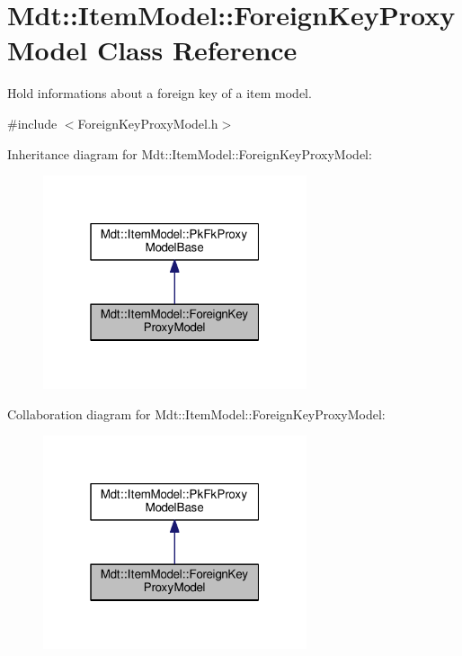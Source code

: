 \hypertarget{class_mdt_1_1_item_model_1_1_foreign_key_proxy_model}{}\section{Mdt\+:\+:Item\+Model\+:\+:Foreign\+Key\+Proxy\+Model Class Reference}
\label{class_mdt_1_1_item_model_1_1_foreign_key_proxy_model}


Hold informations about a foreign key of a item model.  




{\ttfamily \#include $<$Foreign\+Key\+Proxy\+Model.\+h$>$}



Inheritance diagram for Mdt\+:\+:Item\+Model\+:\+:Foreign\+Key\+Proxy\+Model\+:
\nopagebreak
\begin{figure}[H]
\begin{center}
\leavevmode
\includegraphics[width=220pt]{class_mdt_1_1_item_model_1_1_foreign_key_proxy_model__inherit__graph}
\end{center}
\end{figure}


Collaboration diagram for Mdt\+:\+:Item\+Model\+:\+:Foreign\+Key\+Proxy\+Model\+:
\nopagebreak
\begin{figure}[H]
\begin{center}
\leavevmode
\includegraphics[width=220pt]{class_mdt_1_1_item_model_1_1_foreign_key_proxy_model__coll__graph}
\end{center}
\end{figure}
